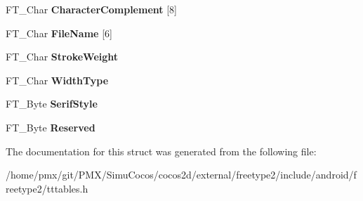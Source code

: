 \begin{DoxyCompactItemize}
\item 
\mbox{\label{structTT__PCLT___a9b575940272aa6f4137ee8fa32a7b9ff}} 
F\+T\+\_\+\+Char {\bfseries Character\+Complement} \mbox{[}8\mbox{]}
\item 
\mbox{\label{structTT__PCLT___aad40001f362a226e79d0aa839ba951eb}} 
F\+T\+\_\+\+Char {\bfseries File\+Name} \mbox{[}6\mbox{]}
\item 
\mbox{\label{structTT__PCLT___aaf28b05ac07bcdc1ae6f4ec9064434fc}} 
F\+T\+\_\+\+Char {\bfseries Stroke\+Weight}
\item 
\mbox{\label{structTT__PCLT___ad6613ad7556599343f999a7d27a0f1d0}} 
F\+T\+\_\+\+Char {\bfseries Width\+Type}
\item 
\mbox{\label{structTT__PCLT___aa8e3d35937660a1e4959ee10a4800e6a}} 
F\+T\+\_\+\+Byte {\bfseries Serif\+Style}
\item 
\mbox{\label{structTT__PCLT___a2e46e3f5eaa51e02d831d3f6143f8846}} 
F\+T\+\_\+\+Byte {\bfseries Reserved}
\end{DoxyCompactItemize}


The documentation for this struct was generated from the following file\+:\begin{DoxyCompactItemize}
\item 
/home/pmx/git/\+P\+M\+X/\+Simu\+Cocos/cocos2d/external/freetype2/include/android/freetype2/tttables.\+h\end{DoxyCompactItemize}
